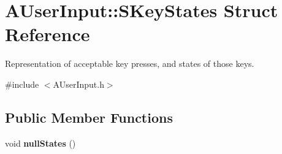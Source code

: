\hypertarget{structAUserInput_1_1SKeyStates}{\section{A\-User\-Input\-:\-:S\-Key\-States Struct Reference}
\label{structAUserInput_1_1SKeyStates}
}


Representation of acceptable key presses, and states of those keys.  




{\ttfamily \#include $<$A\-User\-Input.\-h$>$}

\subsection*{Public Member Functions}
\begin{DoxyCompactItemize}
\item 
\hypertarget{structAUserInput_1_1SKeyStates_a15f162c6a5b63e222fc463e0ac561798}{void {\bfseries null\-States} ()}\label{structAUserInput_1_1SKeyStates_a15f162c6a5b63e222fc463e0ac561798}

\end{DoxyCompactItemize}
